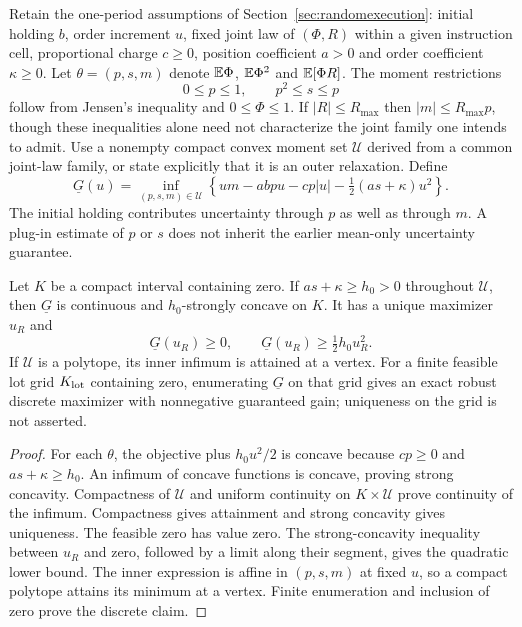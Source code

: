 Retain the one-period assumptions of Section~\ref{sec:randomexecution}:
initial holding $b$, order increment $u$, fixed joint law of
$(\Phi,R)$ within a given instruction cell, proportional charge $c\ge0$,
position coefficient $a>0$ and order coefficient $\kappa\ge0$.
Let $\theta=(p,s,m)$ denote
$\mathbb E\Phi$, $\mathbb E\Phi^2$ and $\mathbb E[\Phi R]$. The moment restrictions
\[
 0\le p\le1,\qquad p^2\le s\le p
\]
follow from Jensen's inequality and $0\le\Phi\le1$.
If $|R|\le R_{\max}$ then $|m|\le R_{\max}p$, though these inequalities
alone need not characterize the joint family one intends to admit.
Use a nonempty compact convex moment set $\mathcal U$ derived from a
common joint-law family, or state explicitly that it is an outer relaxation.
Define
\begin{equation}\label{eq:allmomentgain}
 \underline G(u)=\inf_{(p,s,m)\in\mathcal U}
 \left\{um-abpu-cp|u|-\tfrac12(as+\kappa)u^2\right\}.
\end{equation}
The initial holding contributes uncertainty through $p$ as well as through
$m$. A plug-in estimate of $p$ or $s$ does not inherit the earlier
mean-only uncertainty guarantee.

\begin{proposition}
\label{prop:allmoments}
Let $K$ be a compact interval containing zero. If
$as+\kappa\ge h_0>0$ throughout $\mathcal U$, then
$\underline G$ is continuous and $h_0$-strongly concave on $K$.
It has a unique maximizer $u_R$ and
\[
 \underline G(u_R)\ge0,\qquad
 \underline G(u_R)\ge\tfrac12h_0u_R^2.
\]
If $\mathcal U$ is a polytope, its inner infimum is attained at a vertex.
For a finite feasible lot grid $K_{\rm lot}$ containing zero, enumerating
$\underline G$ on that grid gives an exact robust discrete maximizer
with nonnegative guaranteed gain; uniqueness on the grid is not asserted.
\end{proposition}
\begin{proof}
For each $\theta$, the objective plus $h_0u^2/2$ is concave because
$cp\ge0$ and $as+\kappa\ge h_0$. An infimum of concave functions is
concave, proving strong concavity. Compactness of $\mathcal U$ and uniform
continuity on $K\times\mathcal U$ prove continuity of the infimum.
Compactness gives attainment and strong concavity gives uniqueness.
The feasible zero has value zero. The strong-concavity inequality between
$u_R$ and zero, followed by a limit along their segment, gives the quadratic
lower bound. The inner expression is affine in $(p,s,m)$ at fixed $u$,
so a compact polytope attains its minimum at a vertex. Finite enumeration
and inclusion of zero prove the discrete claim.
\end{proof}

